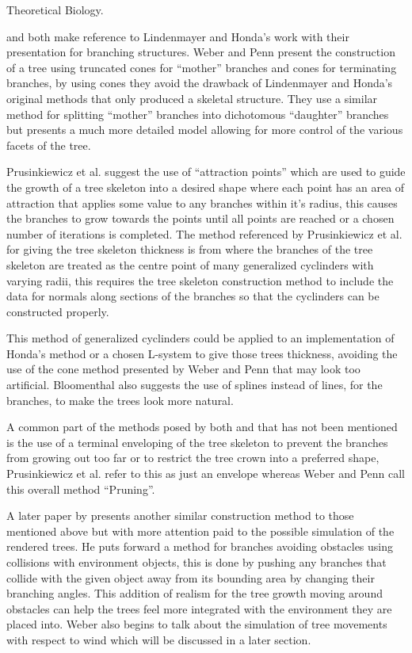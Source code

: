 \documentclass[review]{cmpreport}
\begin{document}
Theoretical Biology. \par
\cite{weber1995rendering} and \cite{runions2007colonization} both make reference to 
Lindenmayer and Honda's work with their presentation for branching structures. 
Weber and Penn present the construction of a tree using truncated cones for ``mother'' 
branches and cones for terminating branches, by using cones they avoid the drawback 
of Lindenmayer and Honda's original methods that only produced a skeletal structure. 
They use a similar method for splitting ``mother'' branches into dichotomous 
``daughter'' branches but presents a much more detailed model allowing for more 
control of the various facets of the tree. \par
Prusinkiewicz et al. suggest the use of ``attraction points'' which are used to 
guide the growth of a tree skeleton into a desired shape where each point has an 
area of attraction that applies some value to any branches within it's radius, this 
causes the branches to grow towards the points until all points are reached or a 
chosen number of iterations is completed. The method referenced by Prusinkiewicz 
et al. for giving the tree skeleton thickness is from \cite{bloomenthal1985modeling} 
where the branches of the tree skeleton are treated as the centre point of many 
generalized cyclinders with varying radii, this requires the tree skeleton construction 
method to include the data for normals along sections of the branches so that the 
cyclinders can be constructed properly. \par
This method of generalized cyclinders could be applied to an implementation of Honda's 
method or a chosen L-system to give those trees thickness, avoiding the use of the 
cone method presented by Weber and Penn that may look too artificial. Bloomenthal 
also suggests the use of splines instead of lines, for the branches, to make the trees 
look more natural. \par
A common part of the methods posed by both \cite{weber1995rendering} and 
\cite{runions2007colonization} that has not been mentioned is the use of a terminal 
enveloping of the tree skeleton to prevent the branches from growing out too far or to 
restrict the tree crown into a preferred shape, Prusinkiewicz et al. refer to this as 
just an envelope whereas Weber and Penn call this overall method ``Pruning''. \par
A later paper by \cite{weber2008simulation} presents another similar construction method 
to those mentioned above but with more attention paid to the possible simulation of the 
rendered trees. He puts forward a method for branches avoiding obstacles using collisions 
with environment objects, this is done by pushing any branches that collide with the given 
object away from its bounding area by changing their branching angles. This addition 
of realism for the tree growth moving around obstacles can help the trees feel more 
integrated with the environment they are placed into. Weber also begins to talk about 
the simulation of tree movements with respect to wind which will be discussed in a 
later section.
\end{document}
